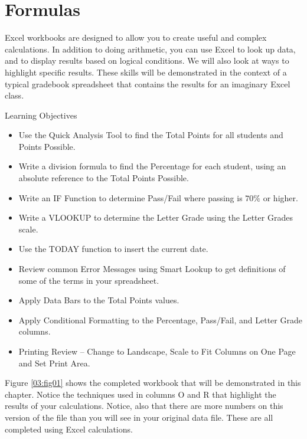 \chapter{Formulas}\label{ch03:formulas}

Excel workbooks are designed to allow you to create useful and complex calculations. In addition to doing arithmetic, you can use Excel to look up data, and to display results based on logical conditions. We will also look at ways to highlight specific results. These skills will be demonstrated in the context of a typical gradebook spreadsheet that contains the results for an imaginary Excel class.

\begin{center}
	\begin{objbox}{Learning Objectives}
		\begin{itemize}
			\setlength{\itemsep}{0pt}
			\setlength{\parskip}{0pt}
			\setlength{\parsep}{0pt}

			\item Use the Quick Analysis Tool to find the Total Points for all students and Points Possible.
			\item Write a division formula to find the Percentage for each student, using an absolute reference to the Total Points Possible.
			\item Write an IF Function to determine Pass/Fail where passing is $ 70\% $ or higher.
			\item Write a VLOOKUP to determine the Letter Grade using the Letter Grades scale.
			\item Use the TODAY function to insert the current date.
			\item Review common Error Messages using Smart Lookup to get definitions of some of the terms in your spreadsheet.
			\item Apply Data Bars to the Total Points values.
			\item Apply Conditional Formatting to the Percentage, Pass/Fail, and Letter Grade columns.
			\item Printing Review – Change to Landscape, Scale to Fit Columns on One Page and Set Print Area.
			
		\end{itemize}
	\end{objbox}
\end{center}

Figure \ref{03:fig01} shows the completed workbook that will be demonstrated in this chapter. Notice the techniques used in columns O and R that highlight the results of your calculations. Notice, also that there are more numbers on this version of the file than you will see in your original data file. These are all completed using Excel calculations.

